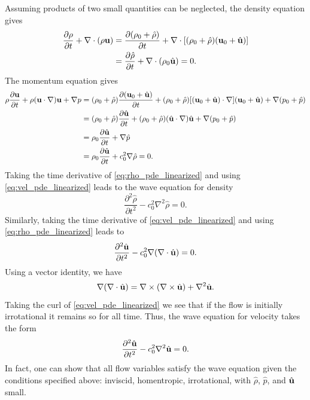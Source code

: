 \documentclass[oneside,a4paper,11pt]{report}
\begin{document}
Assuming products of two small quantities can be neglected, the density equation gives
\begin{align}
\label{eq:rho_pde_linearized}
    \frac{\partial \rho}{\partial t} + \nabla \cdot (\rho \mathbf{u}) &= \frac{\partial (\rho_0 + \hat{\rho})}{\partial t} + \nabla \cdot [ (\rho_0 + \hat{\rho}) (\mathbf{u}_0 + \hat{\mathbf{u}}) ] \nonumber \\
    &= \frac{\partial \hat{\rho}}{\partial t} + \nabla \cdot (\rho_0 \hat{\mathbf{u}}) = 0.
\end{align}
The momentum equation gives
\begin{align}
\label{eq:vel_pde_linearized}
    \rho \frac{\partial \mathbf{u}}{\partial t} + \rho (\mathbf{u} \cdot \nabla) \mathbf{u} + \nabla p &= (\rho_0 + \hat{\rho}) \frac{\partial (\mathbf{u}_0 + \hat{\mathbf{u}}) }{\partial t} + (\rho_0 + \hat{\rho}) [ (\mathbf{u}_0 + \hat{\mathbf{u}}) \cdot \nabla] (\mathbf{u}_0 + \hat{\mathbf{u}}) + \nabla (p_0 + \hat{p}) \nonumber \\
    &= (\rho_0 + \hat{\rho}) \frac{\partial \hat{\mathbf{u}} }{\partial t} + (\rho_0 + \hat{\rho}) ( \hat{\mathbf{u}} \cdot \nabla) \hat{\mathbf{u}} + \nabla (p_0 + \hat{p}) \nonumber \\
    &= \rho_0 \frac{\partial \hat{\mathbf{u}}}{\partial t} + \nabla \hat{p} \nonumber \\
    &= \rho_0 \frac{\partial \hat{\mathbf{u}}}{\partial t} + c^2_0 \nabla \hat{\rho} = 0.
\end{align}
Taking the time derivative of \cref{eq:rho_pde_linearized} and using \cref{eq:vel_pde_linearized} leads to the wave equation for density
\begin{equation}
    \frac{\partial^2 \hat{\rho}}{\partial t^2} - c^2_0 \nabla^2 \hat{\rho} = 0.
\end{equation}
Similarly, taking the time derivative of \cref{eq:vel_pde_linearized} and using \cref{eq:rho_pde_linearized} leads to
\begin{equation}
    \frac{\partial^2 \hat{\mathbf{u}}}{\partial t^2} - c_0^2 \nabla ( \nabla \cdot \hat{\mathbf{u}}) = 0.
\end{equation}
Using a vector identity, we have
\begin{equation}
    \nabla (\nabla \cdot \hat{\mathbf{u}}) = \nabla \times ( \nabla \times \hat{\mathbf{u}}) + \nabla^2 \hat{\mathbf{u}}.
\end{equation}
Taking the curl of \cref{eq:vel_pde_linearized} we see that if the flow is initially irrotational it remains so for all time. Thus, the wave equation for velocity takes the form
\begin{equation}
    \frac{\partial^2 \hat{\mathbf{u}}}{\partial t^2} - c_0^2 \nabla^2 \hat{\mathbf{u}} = 0.
\end{equation}
In fact, one can show that all flow variables satisfy the wave equation given the conditions specified above: inviscid, homentropic, irrotational, with $\hat{\rho}$, $\hat{p}$, and $\hat{\mathbf{u}}$ small.
\end{document}
